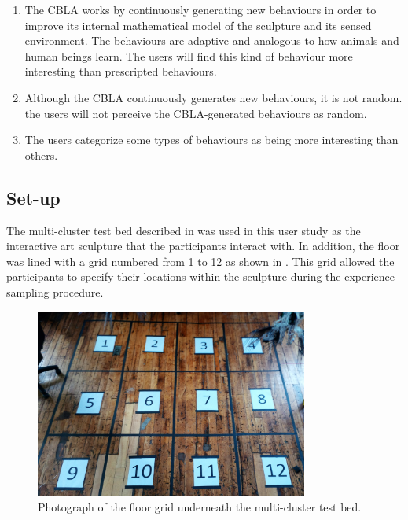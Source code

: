 \begin{enumerate}
	\item The CBLA works by continuously generating new behaviours in order to improve its internal mathematical model of the sculpture and its sensed environment. The behaviours are adaptive and analogous to how animals and human beings learn. The users will find this kind of behaviour more interesting than prescripted behaviours.
	\item Although the CBLA continuously generates new behaviours, it is not random. the users will not perceive the CBLA-generated behaviours as random. 
	\item The users categorize some types of behaviours as being more interesting than others. 
\end{enumerate}

\subsection{Set-up}

The multi-cluster test bed described in  was used in this user study as the interactive art sculpture that the participants interact with. In addition, the floor was lined with a grid numbered from 1 to 12 as shown in . This grid allowed the participants to specify their locations within the sculpture during the experience sampling procedure.  

\begin{figure} [!htb]
	\centering
	\includegraphics[width=0.8\textwidth]{"fig/validations/cbla-test-bed gird photo"}
	\caption[Photograph of the floor grid underneath the multi-cluster test bed]{Photograph of the floor grid underneath the multi-cluster test bed.}
	\label{fig:cbla-test-bed gird photo}
\end{figure}

